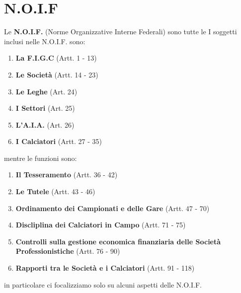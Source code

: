\documentclass[../uefaC.tex]{subfiles}
\begin{document}
\section{N.O.I.F}
Le \textbf{N.O.I.F.} (Norme Organizzative Interne Federali) sono tutte le 
I soggetti inclusi nelle N.O.I.F. sono:
\begin{enumerate}
    \item\textbf{La F.I.G.C} (Artt. 1 - 13)
    \item\textbf{Le Società} (Artt. 14 - 23)
    \item\textbf{Le Leghe} (Art. 24)
    \item\textbf{I Settori} (Art. 25)
    \item\textbf{L'A.I.A.} (Art. 26)
    \item\textbf{I Calciatori} (Artt. 27 - 35)
\end{enumerate}
mentre le funzioni sono:
\begin{enumerate}
    \item\textbf{Il Tesseramento} (Artt. 36 - 42)
    \item\textbf{Le Tutele} (Artt. 43 - 46)
    \item\textbf{Ordinamento dei Campionati e delle Gare} (Artt. 47 - 70)
    \item\textbf{Discliplina dei Calciatori in Campo} (Artt. 71 - 75)
    \item\textbf{Controlli sulla gestione economica finanziaria delle Società Professionistiche} (Artt. 76 - 90)
    \item\textbf{Rapporti tra le Società e i Calciatori} (Artt. 91 - 118)
\end{enumerate}
in particolare ci focalizziamo solo su alcuni aspetti delle N.O.I.F.
\end{document}

